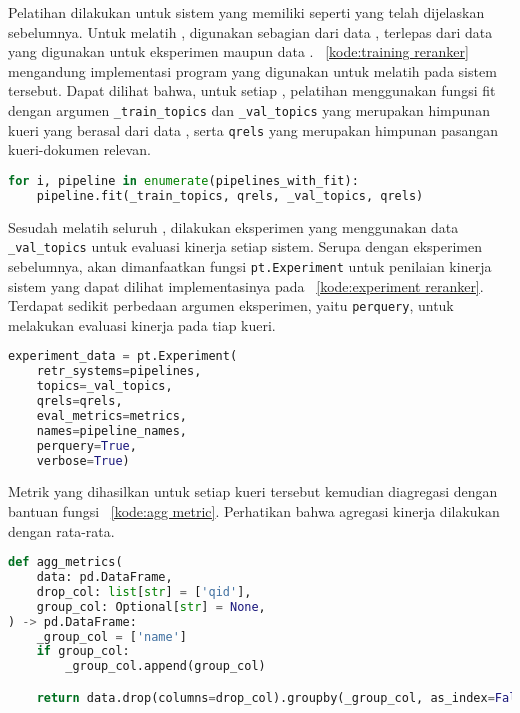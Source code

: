 Pelatihan dilakukan untuk sistem yang memiliki \pipeline{} \reranker{} seperti yang telah dijelaskan sebelumnya. Untuk melatih \lambdamart{}, digunakan sebagian dari data \training{}, terlepas dari data yang digunakan untuk eksperimen maupun data \testing{}. \kode{}~\ref{kode:training reranker} mengandung implementasi program yang digunakan untuk melatih \reranker{} pada sistem \ir{} tersebut. Dapat dilihat bahwa, untuk setiap \pipeline{}, pelatihan menggunakan fungsi fit dengan argumen \lstinline{_train_topics} dan \lstinline{_val_topics} yang merupakan himpunan kueri yang berasal dari data \training{}, serta \lstinline{qrels} yang merupakan himpunan pasangan kueri-dokumen relevan.
\begin{lstlisting}[language=Python, caption={Pelatihan model \reranker{}}, label={kode:training reranker}]
for i, pipeline in enumerate(pipelines_with_fit):
    pipeline.fit(_train_topics, qrels, _val_topics, qrels)
\end{lstlisting}

Sesudah melatih seluruh \reranker{}, dilakukan eksperimen yang menggunakan data \lstinline{_val_topics} untuk evaluasi kinerja setiap sistem. Serupa dengan eksperimen sebelumnya, akan dimanfaatkan fungsi \lstinline{pt.Experiment} untuk penilaian kinerja sistem yang dapat dilihat implementasinya pada \kode{}~\ref{kode:experiment reranker}. Terdapat sedikit perbedaan argumen eksperimen, yaitu \lstinline{perquery}, untuk melakukan evaluasi kinerja pada tiap kueri.
\begin{lstlisting}[language=Python, caption={Eksperimen \retrieval{}}, label={kode:experiment reranker}]
experiment_data = pt.Experiment(
    retr_systems=pipelines,
    topics=_val_topics,
    qrels=qrels,
    eval_metrics=metrics,
    names=pipeline_names,
    perquery=True,
    verbose=True)
\end{lstlisting}

Metrik yang dihasilkan untuk setiap kueri tersebut kemudian diagregasi dengan bantuan fungsi \kode{}~\ref{kode:agg metric}. Perhatikan bahwa agregasi kinerja dilakukan dengan rata-rata.
\begin{lstlisting}[language=Python, caption={Agregasi metrik hasil eksperimen}, label={kode:agg metric}]
def agg_metrics(
    data: pd.DataFrame,
    drop_col: list[str] = ['qid'],
    group_col: Optional[str] = None,
) -> pd.DataFrame:
    _group_col = ['name']
    if group_col:
        _group_col.append(group_col)

    return data.drop(columns=drop_col).groupby(_group_col, as_index=False).mean()
\end{lstlisting}

